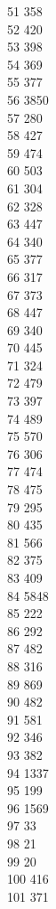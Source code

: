 { 51	358 \\
 52	420 \\
 53	398 \\
 54	369 \\
 55	377 \\
 56	3850 \\
 57	280 \\
 58	427 \\
 59	474 \\
 60	503 \\
 61	304 \\
 62	328 \\
 63	447 \\
 64	340 \\
 65	377 \\
 66	317 \\
 67	373 \\
 68	447 \\
 69	340 \\
 70	445 \\
 71	324 \\
 72	479 \\
 73	397 \\
 74	489 \\
 75	570 \\
 76	306 \\
 77	474 \\
 78	475 \\
 79	295 \\
 80	435 \\
 81	566 \\
 82	375 \\
 83	409 \\
 84	5848 \\
 85	222 \\
 86	292 \\
 87	482 \\
 88	316 \\
 89	869 \\
 90	482 \\
 91	581 \\
 92	346 \\
 93	382 \\
 94	1337 \\
 95	199 \\
 96	1569 \\
 97	33 \\
 98	21 \\
 99	20 \\
 100	416 \\
 101	371 \\
}
